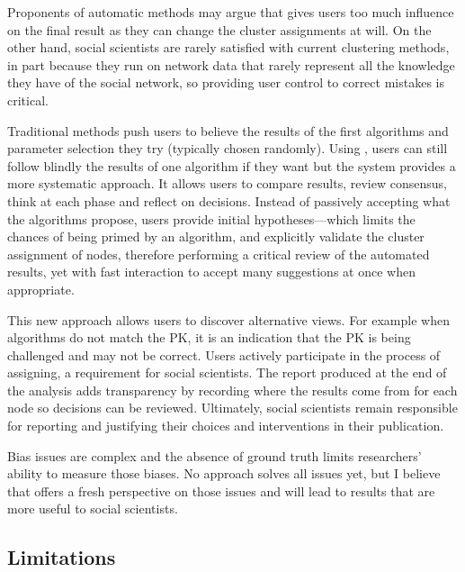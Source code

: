 Proponents of automatic methods may argue that \pkclustering gives users too much influence on the final result as they can change the cluster assignments at will. On the other hand, social scientists are rarely satisfied with current clustering methods, in part because they run on network data that rarely represent all the knowledge they have of the social network, so providing user control to correct mistakes is critical.

Traditional methods push users to believe the results of the first algorithms and parameter selection they try (typically chosen randomly). Using \pkclustering, users can still follow blindly the results of one algorithm if they want but the system provides a more systematic approach. It allows users to compare results, review consensus, think at each phase and reflect on decisions. Instead of passively accepting what the algorithms propose, users provide initial hypotheses---which limits the chances of being primed by an algorithm, and explicitly validate the cluster assignment of nodes, therefore performing a critical review of the automated results, yet with fast interaction to accept many suggestions at once when appropriate.

This new approach allows users to discover alternative views. For example when algorithms do not match the PK, it is an indication that the PK is being challenged and may not be correct.  Users actively participate in the process of assigning, a requirement for social scientists. The report produced at the end of the analysis adds transparency by recording where the results come from for each node so decisions can be reviewed. Ultimately, social scientists remain responsible for reporting and justifying their choices and interventions in their publication.

Bias issues are complex and the absence of ground truth limits researchers' ability to measure those biases. No approach solves all issues yet, but I believe that \pkclustering offers a fresh perspective on those issues and will lead to results that are more useful to social scientists.

\subsection{Limitations}


